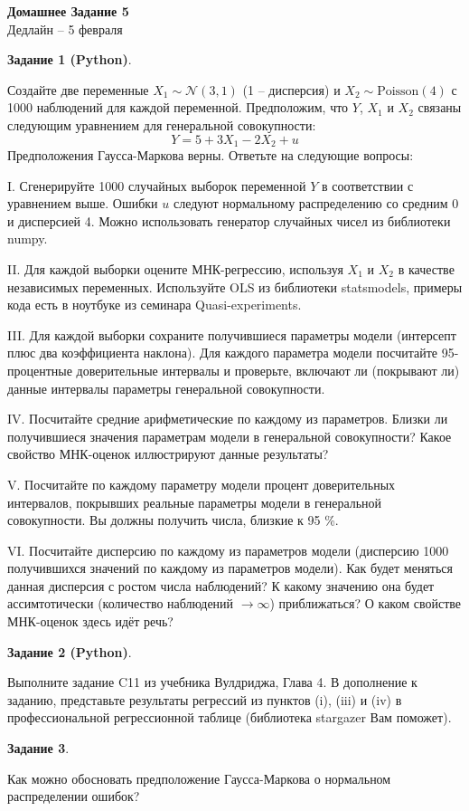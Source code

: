 \documentclass[12pt]{article}
\begin{document}
\begin{center}
\huge \textbf{Домашнее Задание 5} \\
\normalsize Дедлайн -- 5 февраля \\
\end{center}
\textbf{Задание 1 (Python)}.

Создайте две переменные $X_1 \sim \mathcal{N}(3,1)$ (1 -- дисперсия) и $X_2 \sim \text{Poisson}(4)$ с 1000 наблюдений для каждой переменной.  Предположим,  что $Y$, $X_1$ и $X_2$ связаны следующим уравнением для генеральной совокупности: $$Y = 5 + 3 X_1 - 2 X_2 + u$$
Предположения Гаусса-Маркова верны.  Ответьте на следующие вопросы:

I.  Сгенерируйте 1000 случайных выборок переменной  $Y$ в соответствии с уравнением выше.  Ошибки $u$ следуют нормальному распределению со средним 0 и дисперсией 4.  Можно использовать генератор случайных чисел из библиотеки numpy. 

II.  Для каждой выборки оцените МНК-регрессию,  используя $X_1$ и $X_2$ в качестве независимых переменных.  Используйте OLS из библиотеки statsmodels,  примеры кода есть в ноутбуке из семинара Quasi-experiments. 

III.  Для каждой выборки сохраните получившиеся параметры модели (интерсепт плюс два коэффициента наклона).  Для каждого параметра модели посчитайте 95-процентные доверительные интервалы и проверьте,  включают ли (покрывают ли) данные интервалы параметры генеральной совокупности. 

IV.  Посчитайте средние арифметические по каждому из параметров.  Близки ли получившиеся значения параметрам модели в генеральной совокупности? Какое свойство МНК-оценок иллюстрируют данные результаты? 

V.  Посчитайте по каждому параметру модели процент доверительных интервалов,  покрывших реальные параметры модели в генеральной совокупности.  Вы должны получить числа,  близкие к 95 \%.  

VI.  Посчитайте дисперсию по каждому из параметров модели (дисперсию 1000 получившихся значений по каждому из параметров модели).  Как будет меняться данная дисперсия с ростом числа наблюдений? К какому значению она будет ассимтотически (количество наблюдений $\to \infty$) приближаться? О каком свойстве МНК-оценок здесь идёт речь? 

\textbf{Задание 2 (Python)}. 

Выполните задание C11 из учебника Вулдриджа,  Глава 4.  В дополнение к заданию,  представьте результаты регрессий из пунктов (i), (iii) и (iv)  в профессиональной регрессионной таблице (библиотека stargazer Вам поможет). 

\textbf{Задание 3}. 

Как можно обосновать предположение Гаусса-Маркова о нормальном распределении ошибок? 
\end{document}
